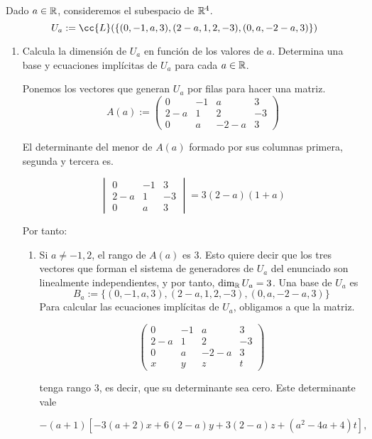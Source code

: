 \documentclass[12pt]{article}
\begin{document}
	\begin{ejercicio}[2.5 puntos] Dado $a \in {\mathbb{R}}$, consideremos el subespacio de ${\mathbb{R}}^4$.
		\begin{equation*}
			U_a := \cc{L}(\{(0, -1, a, 3), (2-a, 1, 2, -3), (0, a, -2-a, 3)\})
		\end{equation*}
		
		\begin{enumerate} 
			\item Calcula la dimensión de $U_a$ en función de los valores de $a$. Determina una base y ecuaciones
			implícitas de $U_a$ para cada $a \in {\mathbb{R}}$.
			
			Ponemos los vectores que generan $U_a$ por filas para hacer una matriz.
			$$
			A(a):=\begin{pmatrix}
				0& -1& a& 3 \\
				2-a& 1& 2& -3 \\
				0& a& -2-a& 3 
			\end{pmatrix}
			$$
			
			El determinante del menor de $A(a)$ formado por sus columnas primera, segunda y tercera es.
			
			$$
			\begin{vmatrix}
				0& -1& 3 \\
				2-a& 1& -3 \\
				0& a& 3 
			\end{vmatrix} = 3(2-a)(1+a)
			$$
			
			Por tanto:
			\begin{enumerate}[label=\roman*.]
				\item Si $a\ne -1,2$, el rango de $A(a)$ es 3. Esto quiere decir que los tres vectores que forman el sistema de generadores de $U_a$ del enunciado son linealmente independientes, y por tanto, $\dim_{{\mathbb{R}}}U_a=3$. Una base de $U_a$ es
				$$ B_a := \{(0, -1, a, 3), (2-a, 1, 2, -3), (0, a, -2-a, 3)\}$$
				Para calcular las ecuaciones implícitas de $U_a$, obligamos a que la matriz.
				
				$$
				\begin{pmatrix}
					0 & -1 & a & 3 \\
					2 - a & 1 & 2 & -3 \\
					0 & a & -2 - a & 3 \\
					x & y & z & t
				\end{pmatrix}
				$$
				
				tenga rango 3, es decir, que su determinante sea cero. Este determinante vale
				
				$$ -(a+1) \left[ -3(a+2)x + 6(2 - a)y + 3(2 - a)z + (a^2 - 4a + 4)t \right],$$
				

\end{enumerate}
\end{enumerate}
\end{ejercicio}
\end{document}
